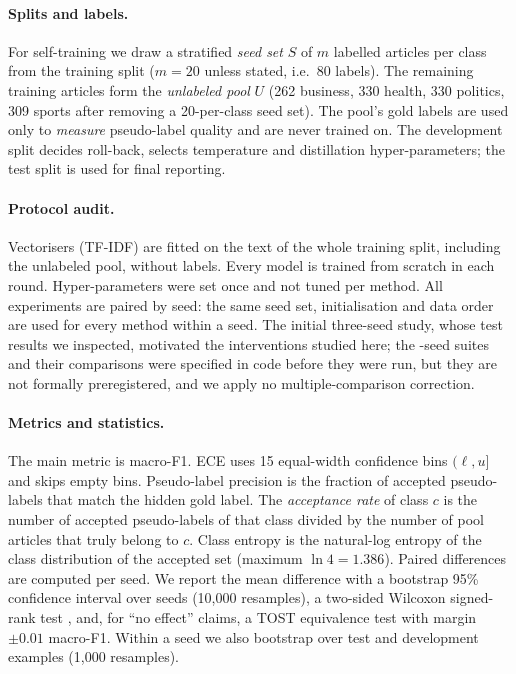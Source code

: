 \documentclass[11pt]{article}
\begin{document}
\paragraph{Splits and labels.} For self-training we draw a stratified \emph{seed set} $S$ of $m$ labelled articles per class from the training split ($m=20$ unless stated, i.e.\ 80 labels). The remaining training articles form the \emph{unlabeled pool} $U$ (262 business, 330 health, 330 politics, 309 sports after removing a 20-per-class seed set). The pool's gold labels are used only to \emph{measure} pseudo-label quality and are never trained on. The development split decides roll-back, selects temperature and distillation hyper-parameters; the test split is used for final reporting.

\paragraph{Protocol audit.} Vectorisers (TF-IDF) are fitted on the text of the whole training split, including the unlabeled pool, without labels. Every model is trained from scratch in each round. Hyper-parameters were set once and not tuned per method. All experiments are paired by seed: the same seed set, initialisation and data order are used for every method within a seed. The initial three-seed study, whose test results we inspected, motivated the interventions studied here; the \nSeeds-seed suites and their comparisons were specified in code before they were run, but they are not formally preregistered, and we apply no multiple-comparison correction.

\paragraph{Metrics and statistics.} The main metric is macro-F1. ECE uses 15 equal-width confidence bins $(\ell, u]$ and skips empty bins. Pseudo-label precision is the fraction of accepted pseudo-labels that match the hidden gold label. The \emph{acceptance rate} of class $c$ is the number of accepted pseudo-labels of that class divided by the number of pool articles that truly belong to $c$. Class entropy is the natural-log entropy of the class distribution of the accepted set (maximum $\ln 4 = 1.386$). Paired differences are computed per seed. We report the mean difference with a bootstrap 95\% confidence interval over seeds (10{,}000 resamples), a two-sided Wilcoxon signed-rank test \citep{wilcoxon1945individual}, and, for ``no effect'' claims, a TOST equivalence test with margin $\pm0.01$ macro-F1. Within a seed we also bootstrap over test and development examples (1{,}000 resamples).
\end{document}
